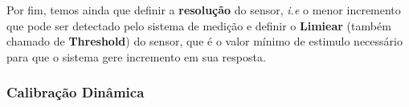 \documentclass{article}
\begin{document}
                Por fim, temos ainda que definir a \textbf{resolução} do sensor, \emph{i.e} o menor incremento que pode ser detectado pelo sistema de medição e definir o \textbf{Limiear} (também
                chamado de \textbf{Threshold}) do sensor, que é o valor mínimo de estimulo necessário para que o sistema gere incremento em sua resposta.

            \subsubsection{Calibração Dinâmica}




    
\end{document}
